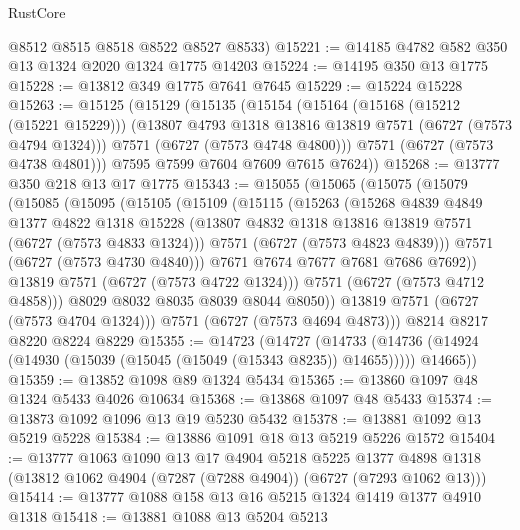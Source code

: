 \begin{lexlean}{RustCore}
\begin{coremodule}
      @8512
      @8515
      @8518
      @8522
      @8527
      @8533)
@15221 := @14185 @4782 @582 @350 @13 @1324 @2020 @1324 @1775 @14203
@15224 := @14195 @350 @13 @1775
@15228 := @13812 @349 @1775 @7641 @7645
@15229 := @15224 @15228
@15263 := @15125
    (@15129
      (@15135
        (@15154
          (@15164
            (@15168 (@15212 (@15221 @15229)))
            (@13807 @4793 @1318 @13816 @13819 @7571 (@6727 (@7573 @4794 @1324)))
            @7571
            (@6727 (@7573 @4748 @4800)))
          @7571
          (@6727 (@7573 @4738 @4801)))
        @7595
        @7599
        @7604
        @7609
        @7615
        @7624))
@15268 := @13777 @350 @218 @13 @17 @1775
@15343 := @15055
    (@15065
      (@15075
        (@15079
          (@15085
            (@15095
              (@15105
                (@15109
                  (@15115
                    (@15263
                      (@15268
                        @4839
                        @4849
                        @1377
                        @4822
                        @1318
                        @15228
                        (@13807 @4832 @1318 @13816 @13819 @7571 (@6727 (@7573 @4833 @1324)))
                        @7571
                        (@6727 (@7573 @4823 @4839)))
                      @7571
                      (@6727 (@7573 @4730 @4840)))
                    @7671
                    @7674
                    @7677
                    @7681
                    @7686
                    @7692))
                @13819
                @7571
                (@6727 (@7573 @4722 @1324)))
              @7571
              (@6727 (@7573 @4712 @4858)))
            @8029
            @8032
            @8035
            @8039
            @8044
            @8050))
        @13819
        @7571
        (@6727 (@7573 @4704 @1324)))
      @7571
      (@6727 (@7573 @4694 @4873)))
    @8214
    @8217
    @8220
    @8224
    @8229
@15355 := @14723
    (@14727
      (@14733 (@14736 (@14924 (@14930 (@15039 (@15045 (@15049 (@15343 @8235)) @14655))))) @14665))
@15359 := @13852 @1098 @89 @1324 @5434
@15365 := @13860 @1097 @48 @1324 @5433 @4026 @10634
@15368 := @13868 @1097 @48 @5433
@15374 := @13873 @1092 @1096 @13 @19 @5230 @5432
@15378 := @13881 @1092 @13 @5219 @5228
@15384 := @13886 @1091 @18 @13 @5219 @5226 @1572
@15404 := @13777
    @1063
    @1090
    @13
    @17
    @4904
    @5218
    @5225
    @1377
    @4898
    @1318
    (@13812 @1062 @4904 (@7287 (@7288 @4904)) (@6727 (@7293 @1062 @13)))
@15414 := @13777 @1088 @158 @13 @16 @5215 @1324 @1419 @1377 @4910 @1318
@15418 := @13881 @1088 @13 @5204 @5213

\end{coremodule}
\end{lexlean}
